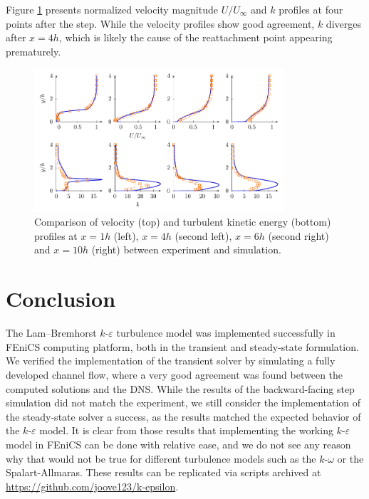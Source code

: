 Figure \ref{fig: backstep profiles} presents normalized velocity magnitude \(U/U_\infty\) and \(k\) profiles at four points after the step. While the velocity profiles show good agreement, \(k\) diverges after \(x = 4h\), which is likely the cause of the reattachment point appearing prematurely. 

\begin{figure}[htbp]
    \centering
    \includegraphics[width=0.825\textwidth]{backstep-profiles.pdf}
    \captionsetup{width=0.85\textwidth}
    \caption{Comparison of velocity (top) and turbulent kinetic energy (bottom) profiles at \(x = 1h\) (left), \(x = 4h\) (second left), \(x = 6h\) (second right) and \(x = 10h\) (right) between experiment and simulation.}
    \label{fig: backstep profiles}
\end{figure}

\section{Conclusion}

The Lam--Bremhorst \(k\)-\(\varepsilon\) turbulence model was implemented successfully in FEniCS computing platform, both in the transient and steady-state formulation. We verified the implementation of the transient solver by simulating a fully developed channel flow, where a very good agreement was found between the computed solutions and the DNS. While the results of the backward-facing step simulation did not match the experiment, we still consider the implementation of the steady-state solver a success, as the results matched the expected behavior of the \(k\)-\(\varepsilon\) model. It is clear from those results that implementing the working \(k\)-\(\varepsilon\) model in FEniCS can be done with relative ease, and we do not see any reason why that would not be true for different turbulence models such as the \(k\)-\(\omega\) or the Spalart-Allmaras. These results can be replicated via scripts archived at \href{https://github.com/joove123/k-epsilon}{https://github.com/joove123/k-epsilon}.

